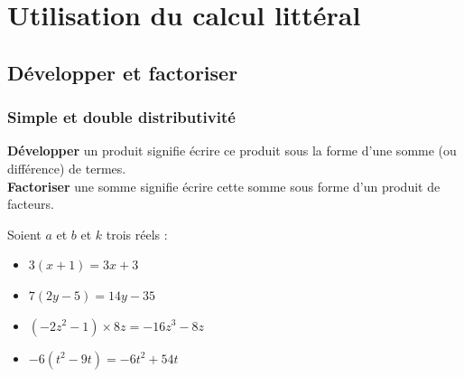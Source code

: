 



\chapter{Utilisation du calcul littéral}





\section{Développer et factoriser}
\subsection{Simple et double distributivité}

\begin{Définition}
{\bf{Développer}} un produit signifie écrire ce produit sous la forme d'une somme (ou différence) de termes. \\
{\bf{Factoriser}} une somme signifie écrire cette somme sous forme d'un produit de facteurs.
\end{Définition}

\vspace{0.5cm}

\begin{Propriété}
Soient $a$ et $b$ et $k$ trois réels : 

\begin{center}
\end{center}

\end{Propriété}

\vspace{0.5cm}

\begin{Exemple}
\leavevmode\vspace{-\baselineskip}
\begin{itemize}[label=\textcolor{Couleur8}{$\bullet$}]
\item $3(x+1)=3x+3$
\item $7(2y-5)=14y-35$
\item $(-2z^2-1)\times 8z=-16z^3-8z$
\item $-6(t^2-9t)=-6t^2+54t$
\end{itemize}
\end{Exemple}

